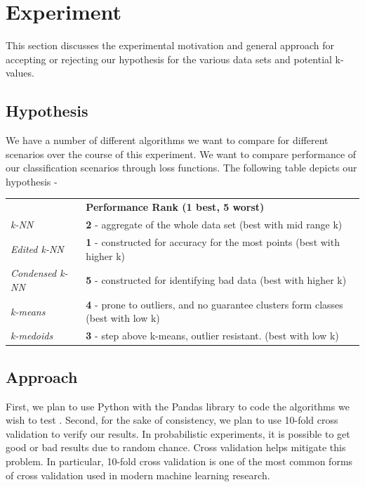 \documentclass[twoside,11pt]{article}
\begin{document}
\section{Experiment}
This section discusses the experimental motivation and general approach for accepting or rejecting our hypothesis for the various data sets and potential k-values.
    
    \subsection{Hypothesis}
    We have a number of different algorithms we want to compare for different scenarios over the course of this experiment. We want to compare performance of our classification scenarios through loss functions. The following table depicts our hypothesis - 
    \begin{table}[h]
\begin{tabular}{ll}
               & \textbf{Performance Rank (1 best, 5 worst)}                                                                                   \\
\textit{k-NN}           & \textbf{2} - aggregate of the whole data set (best with mid range k)                              \\
\textit{Edited k-NN}    & \textbf{1} - constructed for accuracy for the most points (best with higher k)                    \\
\textit{Condensed k-NN} & \textbf{5} - constructed for identifying bad data (best with higher k)                    \\
\textit{k-means}        & \textbf{4} - prone to outliers, and no guarantee clusters form classes (best with low k) \\
\textit{k-medoids}      & \textbf{3} - step above k-means, outlier resistant. (best with low k)                           
\end{tabular}
\end{table}

    \subsection{Approach}
    First, we plan to use Python with the Pandas library to code the algorithms we wish to test \cite{McKinney:2010}. Second, for the sake of consistency, we plan to use 10-fold cross validation to verify our results. In probabilistic experiments, it is possible to get good or bad results due to random chance. Cross validation helps mitigate this problem. In particular, 10-fold cross validation is one of the most common forms of cross validation used in modern machine learning research.
\end{document}
